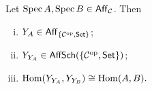 


        \begin{lemma}\label{le:double-rep}
            Let $\operatorname{Spec} A,\operatorname{Spec} B\in\mathsf{Aff}_{\mathcal{C}}$.
            Then
            \begin{enumerate}[(i)]
                \item $Y_A\in\mathsf{Aff}_{\{{\mathcal{C}}^{\mathrm{op}},\mathsf{Set}\}}$;
                \item $Y_{Y_A}\in\mathsf{AffSch}(\{{\mathcal{C}}^{\mathrm{op}},\mathsf{Set}\})$;
                \item $\operatorname{Hom}(Y_{Y_A},Y_{Y_B})\cong\operatorname{Hom}(A,B).$\qedhere
            \end{enumerate}
        \end{lemma}

